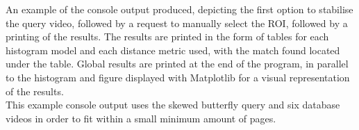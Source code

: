 An example of the console output produced, depicting the first option to stabilise the query video, followed by a request to manually select the ROI, followed by a printing of the results. The results are printed in the form of tables for each histogram model and each distance metric used, with the match found located under the table. Global results are printed at the end of the program, in parallel to the histogram and figure displayed with Matplotlib for a visual representation of the results.\\

This example console output uses the skewed butterfly query and six database videos in order to fit within a small minimum amount of pages.

